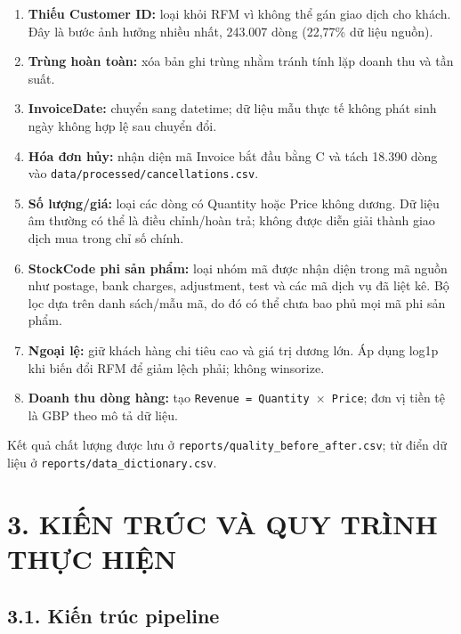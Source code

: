\documentclass[a4paper]{article}
\begin{document}
\begin{enumerate}
\item \textbf{Thiếu Customer ID:} loại khỏi RFM vì không thể gán giao dịch cho khách. Đây là bước ảnh hưởng nhiều nhất, 243.007 dòng (22,77\% dữ liệu nguồn).
\item \textbf{Trùng hoàn toàn:} xóa bản ghi trùng nhằm tránh tính lặp doanh thu và tần suất.
\item \textbf{InvoiceDate:} chuyển sang datetime; dữ liệu mẫu thực tế không phát sinh ngày không hợp lệ sau chuyển đổi.
\item \textbf{Hóa đơn hủy:} nhận diện mã Invoice bắt đầu bằng C và tách 18.390 dòng vào \texttt{data/processed/cancellations.csv}.
\item \textbf{Số lượng/giá:} loại các dòng có Quantity hoặc Price không dương. Dữ liệu âm thường có thể là điều chỉnh/hoàn trả; không được diễn giải thành giao dịch mua trong chỉ số chính.
\item \textbf{StockCode phi sản phẩm:} loại nhóm mã được nhận diện trong mã nguồn như postage, bank charges, adjustment, test và các mã dịch vụ đã liệt kê. Bộ lọc dựa trên danh sách/mẫu mã, do đó có thể chưa bao phủ mọi mã phi sản phẩm.
\item \textbf{Ngoại lệ:} giữ khách hàng chi tiêu cao và giá trị dương lớn. Áp dụng log1p khi biến đổi RFM để giảm lệch phải; không winsorize.
\item \textbf{Doanh thu dòng hàng:} tạo \texttt{Revenue = Quantity \ensuremath{\times} Price}; đơn vị tiền tệ là GBP theo mô tả dữ liệu.
\end{enumerate}

Kết quả chất lượng được lưu ở \texttt{reports/quality\_before\_after.csv}; từ điển dữ liệu ở \texttt{reports/data\_dictionary.csv}.


\section*{3. KIẾN TRÚC VÀ QUY TRÌNH THỰC HIỆN}

\subsection*{3.1. Kiến trúc pipeline}
\end{document}
